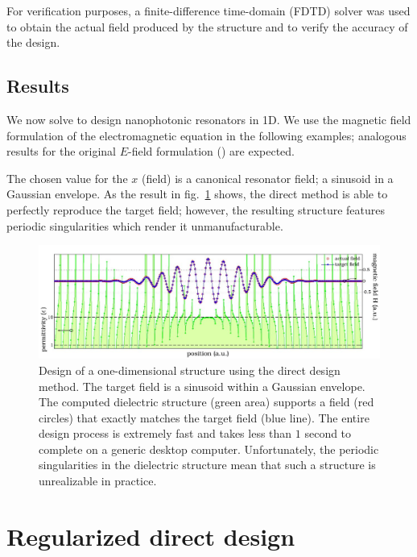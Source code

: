 For verification purposes, 
    a finite-difference time-domain (FDTD) solver was used 
    to obtain the actual field produced by the structure and 
    to verify the accuracy of the design.  

\section{Results}
We now solve  to design nanophotonic resonators in 1D\cite{Lu10}.
We use the magnetic field formulation of the electromagnetic equation
    in the following examples;
    analogous results for the original $E$-field formulation ()
    are expected.

The chosen value for the $x$ (field) is a canonical resonator field; 
    a sinusoid in a Gaussian envelope.
As the result in fig.~\ref{p1:direct} shows,
    the direct method is able to perfectly reproduce the target field;
    however, the resulting structure features
    periodic singularities which render it unmanufacturable.

\begin{figure}[htbp]\centering
\includegraphics[width=\textwidth]{p1/leastsquares}
\caption{Design of a one-dimensional structure using the direct design method.
    The target field is a sinusoid within a Gaussian envelope. 
    The computed dielectric structure (green area) supports 
        a field (red circles) that exactly matches the target field (blue line). 
    The entire design process is extremely fast and takes less than 
        $1$ second to complete on a generic desktop computer.
    Unfortunately, the periodic singularities in the dielectric structure 
        mean that such a structure is unrealizable in practice.}
\label{p1:direct}\end{figure}

\chapter{Regularized direct design}\label{regularized}
